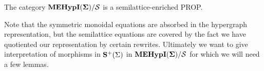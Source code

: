 \begin{proposition}[Soundness]
\label{prop:soundness}
The category ${\mathbf{MEHypI(\Sigma)}}/{\mathcal{S}}$ is a semilattice-enriched PROP. 
\end{proposition}
Note that the symmetric monoidal equations are absorbed in the hypergraph representation,  but the semilattice equations are covered by the fact we have quotiented our representation by certain rewrites. 
Ultimately we want to give interpretation of morphisms in $\mathbf{S}^{+}(\Sigma)$ in ${\mathbf{MEHypI(\Sigma)}} / \mathcal{S}$ for which we will need a few lemmas.




